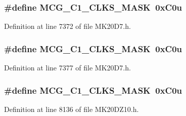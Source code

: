 \subsubsection[{\texorpdfstring{M\+C\+G\+\_\+\+C1\+\_\+\+C\+L\+K\+S\+\_\+\+M\+A\+SK}{MCG_C1_CLKS_MASK}}]{\setlength{\rightskip}{0pt plus 5cm}\#define M\+C\+G\+\_\+\+C1\+\_\+\+C\+L\+K\+S\+\_\+\+M\+A\+SK~0x\+C0u}\hypertarget{group___m_c_g___register___masks_gae9a1db29d56ef219e4df3dc9d945b08e}{}\label{group___m_c_g___register___masks_gae9a1db29d56ef219e4df3dc9d945b08e}


Definition at line 7372 of file M\+K20\+D7.\+h.

\subsubsection[{\texorpdfstring{M\+C\+G\+\_\+\+C1\+\_\+\+C\+L\+K\+S\+\_\+\+M\+A\+SK}{MCG_C1_CLKS_MASK}}]{\setlength{\rightskip}{0pt plus 5cm}\#define M\+C\+G\+\_\+\+C1\+\_\+\+C\+L\+K\+S\+\_\+\+M\+A\+SK~0x\+C0u}\hypertarget{group___m_c_g___register___masks_gae9a1db29d56ef219e4df3dc9d945b08e}{}\label{group___m_c_g___register___masks_gae9a1db29d56ef219e4df3dc9d945b08e}


Definition at line 7377 of file M\+K20\+D7.\+h.

\subsubsection[{\texorpdfstring{M\+C\+G\+\_\+\+C1\+\_\+\+C\+L\+K\+S\+\_\+\+M\+A\+SK}{MCG_C1_CLKS_MASK}}]{\setlength{\rightskip}{0pt plus 5cm}\#define M\+C\+G\+\_\+\+C1\+\_\+\+C\+L\+K\+S\+\_\+\+M\+A\+SK~0x\+C0u}\hypertarget{group___m_c_g___register___masks_gae9a1db29d56ef219e4df3dc9d945b08e}{}\label{group___m_c_g___register___masks_gae9a1db29d56ef219e4df3dc9d945b08e}


Definition at line 8136 of file M\+K20\+D\+Z10.\+h.


